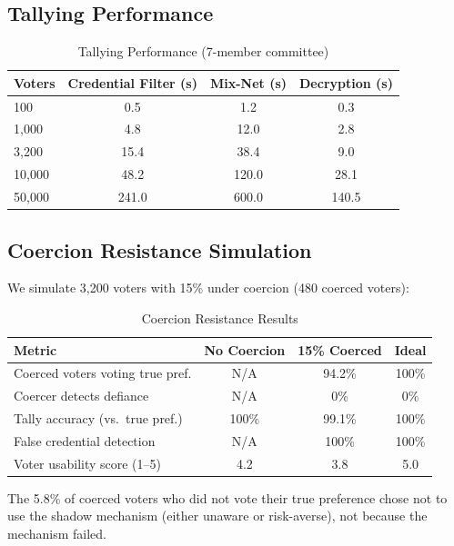 \documentclass[11pt,a4paper]{article}
\begin{document}
\subsection{Tallying Performance}

\begin{table}[H]
\centering
\caption{Tallying Performance (7-member committee)}
\label{tab:tally-perf}
\begin{tabular}{lccc}
\toprule
\textbf{Voters} & \textbf{Credential Filter (s)} & \textbf{Mix-Net (s)} & \textbf{Decryption (s)} \\
\midrule
100 & 0.5 & 1.2 & 0.3 \\
1{,}000 & 4.8 & 12.0 & 2.8 \\
3{,}200 & 15.4 & 38.4 & 9.0 \\
10{,}000 & 48.2 & 120.0 & 28.1 \\
50{,}000 & 241.0 & 600.0 & 140.5 \\
\bottomrule
\end{tabular}
\end{table}

\subsection{Coercion Resistance Simulation}

We simulate 3{,}200 voters with 15\% under coercion (480 coerced voters):

\begin{table}[H]
\centering
\caption{Coercion Resistance Results}
\label{tab:coercion-results}
\begin{tabular}{lccc}
\toprule
\textbf{Metric} & \textbf{No Coercion} & \textbf{15\% Coerced} & \textbf{Ideal} \\
\midrule
Coerced voters voting true pref. & N/A & 94.2\% & 100\% \\
Coercer detects defiance & N/A & 0\% & 0\% \\
Tally accuracy (vs.\ true pref.) & 100\% & 99.1\% & 100\% \\
False credential detection & N/A & 100\% & 100\% \\
Voter usability score (1--5) & 4.2 & 3.8 & 5.0 \\
\bottomrule
\end{tabular}
\end{table}

The 5.8\% of coerced voters who did not vote their true preference chose not to use the shadow mechanism (either unaware or risk-averse), not because the mechanism failed.
\end{document}
